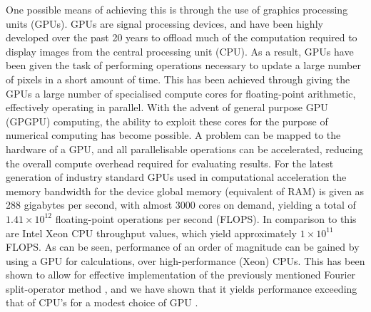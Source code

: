 One possible means of achieving this is through the use of graphics processing units (GPUs). GPUs are signal processing devices, and have been highly developed over the past 20 years to offload much of the computation required to display images from the central processing unit (CPU). As a result, GPUs have been given the task of performing operations necessary to update a large number of pixels in a short amount of time. This has been achieved through giving the GPUs a large number of specialised compute cores for floating-point arithmetic, effectively operating in parallel. With the advent of general purpose GPU (GPGPU) computing, the ability to exploit these cores for the purpose of numerical computing has become possible. A problem can be mapped to the hardware of a GPU, and all parallelisable operations can be accelerated, reducing the overall compute overhead required for evaluating results. For the latest generation of industry standard GPUs used in computational
acceleration the memory bandwidth for the device global memory (equivalent of RAM) is given as 288 gigabytes per second, with almost 3000 cores on demand, yielding a total of $1.41\times10^{12}$ floating-point operations per second (FLOPS). In comparison to this are Intel Xeon CPU throughput values, which yield approximately $1\times10^{11}$ FLOPS. As can be seen, performance of an order of magnitude can be gained by using a GPU for calculations, over high-performance (Xeon) CPUs. This has been shown to allow for effective implementation of the previously mentioned Fourier split-operator method \cite{Num:Bauke_cpc_2011}, and we have shown that it yields performance exceeding that of CPU's for a modest choice of GPU \cite{AO:Morgan_ORiordan_pra_2013}.

